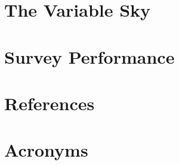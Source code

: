 \documentclass[SE,lsstdraft,authoryear,toc]{lsstdoc}
\begin{document}


\section{The Variable Sky}






%

\section{Survey Performance} \label{sec:survey_performance}







\appendix
\section{References} \label{sec:bib}
\renewcommand{\refname}{} %


\section{Acronyms} \label{sec:acronyms}

\end{document}

